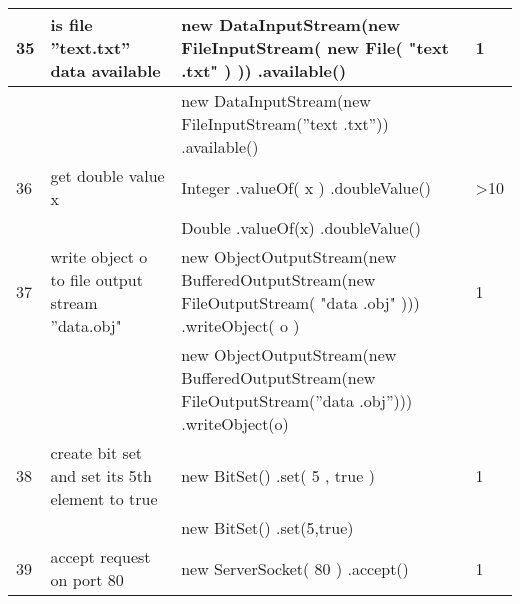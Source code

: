 \begin{longtable}{|p{}|p{}|p{}|p{}|}
		\rowcolor[HTML]{FFCCC9} 
		35                                & is file ”text.txt” data available                      & new DataInputStream(new FileInputStream( new File( "text .txt" ) )) .available()                                 & 1                                       \\ \hline
		\rowcolor[HTML]{9AFF99} 
		&                                                        & new DataInputStream(new FileInputStream(”text .txt”)) .available()                                               &                                         \\ \hline
		\rowcolor[HTML]{FFCCC9} 
		36                                & get double value x                                     & Integer .valueOf( x ) .doubleValue()                                                                             & \textgreater{}10                        \\ \hline
		\rowcolor[HTML]{9AFF99} 
		&                                                        & Double .valueOf(x) .doubleValue()                                                                                &                                         \\ \hline
		\rowcolor[HTML]{FFCCC9} 
		37                                & write object o to file output stream ”data.obj"        & new ObjectOutputStream(new BufferedOutputStream(new FileOutputStream( "data .obj" ))) .writeObject( o )          & 1                                       \\ \hline
		\rowcolor[HTML]{9AFF99} 
		&                                                        & new ObjectOutputStream(new BufferedOutputStream(new FileOutputStream(”data .obj”))) .writeObject(o)              &                                         \\ \hline
		\rowcolor[HTML]{FFCCC9} 
		38                                & create bit set and set its 5th element to true         & new BitSet()  .set( 5 , true )                                                                                   & 1                                       \\ \hline
		\rowcolor[HTML]{9AFF99} 
		&                                                        & new BitSet() .set(5,true)                                                                                        &                                         \\ \hline
		\rowcolor[HTML]{FFCCC9} 
		39                                & accept request on port 80                              & new ServerSocket( 80 ) .accept()                                                                                 & 1                                       \\ \hline

\end{longtable}
